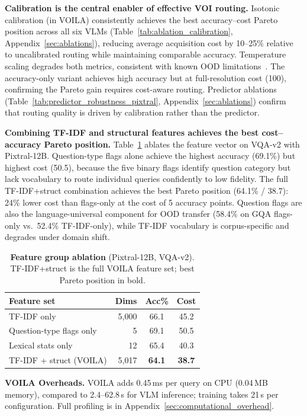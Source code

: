 \textbf{Calibration is the central enabler of effective VOI routing.}
Isotonic calibration (in \textsc{VOILA}) consistently achieves the best accuracy--cost Pareto position across all six VLMs (Table~\ref{tab:ablation_calibration}, Appendix~\ref{sec:ablations}), reducing average acquisition cost by 10--25\% relative to uncalibrated routing while maintaining comparable accuracy.
Temperature scaling degrades both metrics, consistent with known OOD limitations~\cite{guo2017calibrationmodernneuralnetworks}.
The accuracy-only variant achieves high accuracy but at full-resolution cost (100), confirming the Pareto gain requires cost-aware routing.
Predictor ablations (Table~\ref{tab:predictor_robustness_pixtral}, Appendix~\ref{sec:ablations}) confirm that routing quality is driven by calibration rather than the predictor.

\textbf{Combining TF-IDF and structural features achieves the best cost--accuracy Pareto position.}
Table~\ref{tab:feature_ablation} ablates the feature vector on VQA-v2 with Pixtral-12B.
Question-type flags alone achieve the highest accuracy (69.1\%) but highest cost (50.5), because the five binary flags identify question category but lack vocabulary to route individual queries confidently to low fidelity.
The full TF-IDF+struct combination achieves the best Pareto position (64.1\% / 38.7): 24\% lower cost than flags-only at the cost of 5 accuracy points.
Question flags are also the language-universal component for OOD transfer (58.4\% on GQA flags-only vs.\ 52.4\% TF-IDF-only), while TF-IDF vocabulary is corpus-specific and degrades under domain shift.

\begin{table}[htb]
\centering
\small
\setlength{\tabcolsep}{4pt}
\renewcommand{\arraystretch}{0.95}
\caption{\textbf{Feature group ablation} (Pixtral-12B, VQA-v2). TF-IDF+struct is the full \textsc{VOILA} feature set; best Pareto position in bold.
}
\label{tab:feature_ablation}
\begin{tabular}{lrcc}
\toprule
\textbf{Feature set} & \textbf{Dims} & \textbf{Acc\%} & \textbf{Cost} \\
\midrule
TF-IDF only              & 5{,}000 & 66.1 & 45.2 \\
Question-type flags only & 5       & 69.1 & 50.5 \\
Lexical stats only       & 12      & 65.4 & 40.3 \\
TF-IDF + struct (\textsc{VOILA}) & 5{,}017 & \textbf{64.1} & \textbf{38.7} \\
\bottomrule
\end{tabular}
\end{table}

\textbf{VOILA Overheads.} \textsc{VOILA} adds 0.45\,ms per query on CPU (0.04\,MB memory), compared to 2.4--62.8\,s for VLM inference; training takes 21\,s per configuration. Full profiling is in Appendix~\ref{sec:computational_overhead}.
